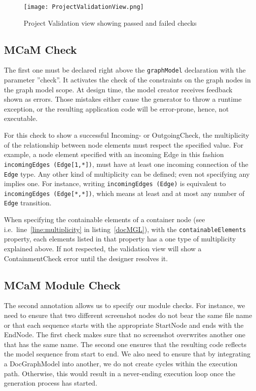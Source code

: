 \begin{figure}[h]
    \centering
    \texttt{[image: ProjectValidationView.png]}
    \caption{Project Validation view showing passed and failed checks}
    \label{fig:modelChecks}
\end{figure}

\subsection{MCaM Check}\label{sec:mcamCheck}

The first one must be declared right above the \lstinline[language=MGL]{graphModel} declaration with the parameter ''check''. It activates the check of the constraints on the graph nodes in the graph model scope. At design time, the model creator receives feedback shown as errors. Those mistakes either cause the generator to throw a runtime exception, or the resulting application code will be error-prone, hence, not executable. 

For this check to show a successful Incoming- or OutgoingCheck, the multiplicity of the relationship between node elements must respect the specified value. For example, a node element specified with an incoming Edge in this fashion \lstinline[language=MGL]{incomingEdges (Edge[1,*])}, must have at least one incoming connection of the \lstinline[language=MGL]{Edge} type. Any other kind of multiplicity can be defined; even not specifying any implies one. For instance, writing \lstinline[language=MGL]{incomingEdges (Edge)} is equivalent to \lstinline[language=MGL]{incomingEdges (Edge[*,*])}, which means at least and at most any number of \lstinline[language=MGL]{Edge} transition.

When specifying the containable elements of a container node (see i.e.~line~\ref{line:multiplicity} in listing~\ref{docMGL}), with the \lstinline[language=MGL]{containableElements} property, each elements listed in that property has a one type of multiplicity explained above. If not respected, the validation view will show a ContainmentCheck error until the designer resolves it.

\subsection{MCaM Module Check}\label{sec:mcamModCheck}

The second annotation allows us to specify our module checks. For instance, we need to ensure that two different screenshot nodes do not bear the same file name or that each sequence starts with the appropriate StartNode and ends with the EndNode. The first check makes sure that no screenshot overwrites another one that has the same name. The second one ensures that the resulting code reflects the model sequence from start to end. We also need to ensure that by integrating a DocGraphModel into another, we do not create cycles within the execution path. Otherwise, this would result in a never-ending execution loop once the generation process has started.

